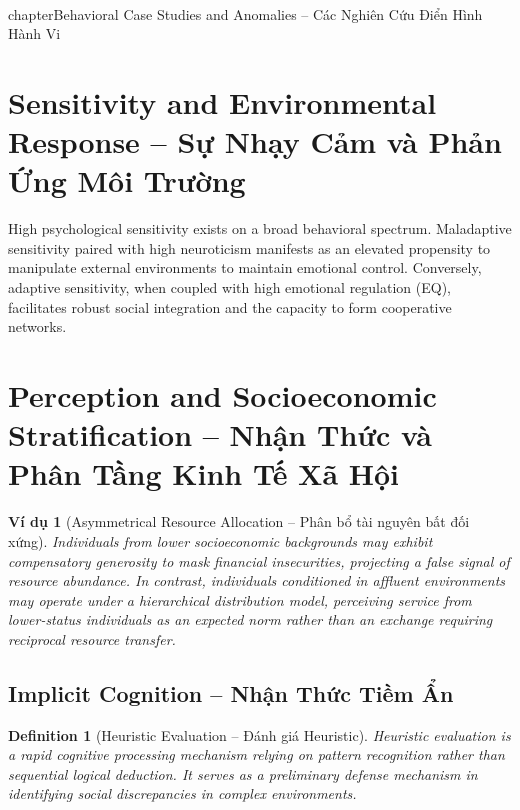 \documentclass{report}
\newtheorem{definition}{Definition}
\newtheorem{vidu}{Ví dụ}
\begin{document}

\\chapter{Behavioral Case Studies and Anomalies -- Các Nghiên Cứu Điển Hình Hành Vi}

\section{Sensitivity and Environmental Response -- Sự Nhạy Cảm và Phản Ứng Môi Trường}
High psychological sensitivity exists on a broad behavioral spectrum. Maladaptive sensitivity paired with high neuroticism manifests as an elevated propensity to manipulate external environments to maintain emotional control. Conversely, adaptive sensitivity, when coupled with high emotional regulation (EQ), facilitates robust social integration and the capacity to form cooperative networks.

\section{Perception and Socioeconomic Stratification -- Nhận Thức và Phân Tầng Kinh Tế Xã Hội}

\begin{vidu}[Asymmetrical Resource Allocation -- Phân bổ tài nguyên bất đối xứng]
    Individuals from lower socioeconomic backgrounds may exhibit compensatory generosity to mask financial insecurities, projecting a false signal of resource abundance. In contrast, individuals conditioned in affluent environments may operate under a hierarchical distribution model, perceiving service from lower-status individuals as an expected norm rather than an exchange requiring reciprocal resource transfer.
\end{vidu}

\subsection{Implicit Cognition -- Nhận Thức Tiềm Ẩn}

\begin{definition}[Heuristic Evaluation -- Đánh giá Heuristic]
    Heuristic evaluation is a rapid cognitive processing mechanism relying on pattern recognition rather than sequential logical deduction. It serves as a preliminary defense mechanism in identifying social discrepancies in complex environments.
\end{definition}
\end{document}
